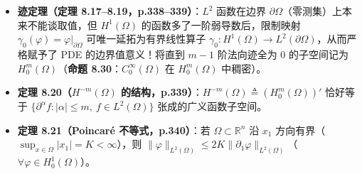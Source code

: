\documentclass[11pt,a4paper]{article}
\providecommand{\tightlist}{\setlength{\itemsep}{1.8pt}\setlength{\parskip}{0pt}}
\newcommand{\SoftDivider}{%
  \par\vspace{5pt}\noindent\makebox[\linewidth][c]{\textcolor{BorderColor}{\rule{0.38\linewidth}{0.6pt}}}\par\vspace{5pt}%
}
\begin{document}
\begin{itemize}
\tightlist
\item
  \textbf{迹定理（定理 8.17--8.19，p.338--339）}：\(L^2\) 函数在边界 \(\partial\Omega\)（零测集）上本来不能谈取值，但 \(H^1(\Omega)\) 的函数多了一阶弱导数后，限制映射 \(\gamma_0(\varphi) = \varphi|_{\partial\Omega}\) 可唯一延拓为有界线性算子 \(\gamma_0: H^1(\Omega) \to L^2(\partial\Omega)\)，从而严格赋予了 PDE 的边界值意义！将直到 \(m-1\) 阶法向迹全为 \(0\) 的子空间记为 \(H_0^m(\Omega)\)（\textbf{命题 8.30}：\(C_0^\infty(\Omega)\) 在 \(H_0^m(\Omega)\) 中稠密）。
\item
  \textbf{定理 8.20（\(H^{-m}(\Omega)\) 的结构，p.339）}：\(H^{-m}(\Omega) \triangleq (H_0^m(\Omega))'\) 恰好等于 \(\{\partial^\alpha f : |\alpha| \le m,\ f \in L^2(\Omega)\}\) 张成的广义函数子空间。
\item
  \textbf{定理 8.21（Poincaré 不等式，p.340）}：若 \(\Omega \subset \mathbb{R}^n\) 沿 \(x_1\) 方向有界（\(\sup_{x\in\Omega}|x_1| = K < \infty\)），则 \(\|\varphi\|_{L^2(\Omega)} \le 2K\|\partial_1\varphi\|_{L^2(\Omega)}\)（\(\forall \varphi \in H_0^1(\Omega)\)）。
\end{itemize}

\SoftDivider
\end{document}
